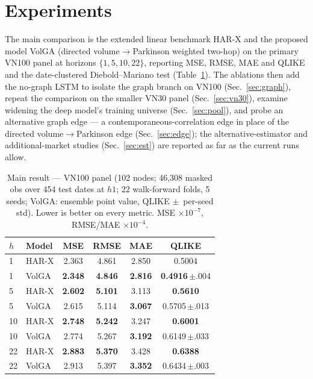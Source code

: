 \documentclass[runningheads]{llncs}
\begin{document}
\section{Experiments}
The main comparison is the extended linear benchmark HAR-X and the proposed model VolGA (directed
volume$\to$Parkinson weighted two-hop) on the primary VN100 panel at horizons $\{1,5,10,22\}$,
reporting MSE, RMSE, MAE and QLIKE and the date-clustered Diebold--Mariano test (Table~\ref{tab:vn100main}).
The ablations then add the no-graph LSTM to isolate the graph branch on VN100 (Sec.~\ref{sec:graph}),
repeat the comparison on the smaller VN30 panel (Sec.~\ref{sec:vn30}), examine widening the deep
model's training universe (Sec.~\ref{sec:pool}), and probe an alternative graph edge --- a
contemporaneous-correlation edge in place of the directed volume$\to$Parkinson edge
(Sec.~\ref{sec:edge}); the alternative-estimator and additional-market studies (Sec.~\ref{sec:est})
are reported as far as the current runs allow.

\begin{table}[t]
\centering
\caption{Main result --- VN100 panel (102 nodes; 46{,}308 masked obs over 454 test dates at $h1$;
22 walk-forward folds, 5 seeds; VolGA: ensemble point value, QLIKE $\pm$~per-seed std). Lower is
better on every metric. MSE $\times10^{-7}$, RMSE/MAE $\times10^{-4}$.}
\label{tab:vn100main}
\footnotesize
\setlength{\tabcolsep}{6pt}
\begin{tabular}{llcccc}
\toprule
$h$ & Model & MSE & RMSE & MAE & QLIKE \\
\midrule
1 & HAR-X & 2.363 & 4.861 & 2.850 & 0.5004 \\
1 & VolGA & \textbf{2.348} & \textbf{4.846} & \textbf{2.816} & \textbf{0.4916}\,$\pm$.004 \\
\midrule
5 & HAR-X & \textbf{2.602} & \textbf{5.101} & 3.113 & \textbf{0.5610} \\
5 & VolGA & 2.615 & 5.114 & \textbf{3.067} & 0.5705\,$\pm$.013 \\
\midrule
10 & HAR-X & \textbf{2.748} & \textbf{5.242} & 3.247 & \textbf{0.6001} \\
10 & VolGA & 2.774 & 5.267 & \textbf{3.192} & 0.6149\,$\pm$.033 \\
\midrule
22 & HAR-X & \textbf{2.883} & \textbf{5.370} & 3.428 & \textbf{0.6388} \\
22 & VolGA & 2.913 & 5.397 & \textbf{3.352} & 0.6434\,$\pm$.003 \\
\bottomrule
\end{tabular}
\end{table}
\end{document}
